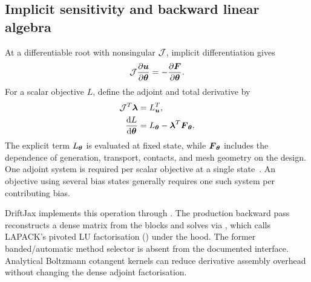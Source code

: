 \subsection{Implicit sensitivity and backward linear algebra}
At a differentiable root with nonsingular $\mathcal{J}$, implicit
differentiation gives~\cite{mann2022partial,blondel2022}
\begin{equation}
\mathcal{J}\frac{\partial\boldsymbol{u}}{\partial\boldsymbol{\theta}}
=-\frac{\partial\boldsymbol{F}}{\partial\boldsymbol{\theta}}.
\end{equation}
For a scalar objective $L$, define the adjoint and total derivative by
\begin{align}
\mathcal{J}^T\boldsymbol{\lambda}&=L_{\boldsymbol{u}}^T,\label{eq:adjointsolve}\\
\frac{\mathrm{d} L}{\mathrm{d}\boldsymbol{\theta}}&=L_{\boldsymbol{\theta}}
-\boldsymbol{\lambda}^T\boldsymbol{F}_{\boldsymbol{\theta}}.\label{eq:gradient}
\end{align}
The explicit term $L_{\boldsymbol{\theta}}$ is evaluated at fixed state, while
$\boldsymbol{F}_{\boldsymbol{\theta}}$ includes the dependence of generation, transport,
contacts, and mesh geometry on the design. One adjoint system is required
per scalar objective at a single state~\cite{blondel2022}. An objective using several bias
states generally requires one such system per contributing bias.

DriftJax implements this operation through . The
production backward pass reconstructs a dense matrix from the blocks and
solves via , which calls LAPACK's pivoted LU
factorisation () under the hood. The former banded/automatic
method selector is absent from the documented 
interface. Analytical Boltzmann cotangent kernels can reduce derivative
assembly overhead without changing the dense adjoint factorisation.

